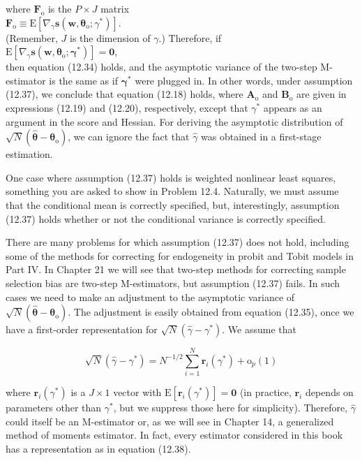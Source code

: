 \documentclass[10pt]{article}
\begin{document}
where $\mathbf{F}_{\mathrm{o}}$ is the $P \times J$ matrix\\
$\mathbf{F}_{\mathrm{o}} \equiv \mathrm{E}\left[\nabla_{\gamma} \mathbf{s}\left(\mathbf{w}, \boldsymbol{\theta}_{\mathrm{o}} ; \gamma^{*}\right)\right]$.\\
(Remember, $J$ is the dimension of $\gamma$.) Therefore, if\\
$\mathrm{E}\left[\nabla_{\gamma} \mathbf{s}\left(\mathbf{w}, \boldsymbol{\theta}_{\mathrm{o}} ; \boldsymbol{\gamma}^{*}\right)\right]=\mathbf{0}$,\\
then equation (12.34) holds, and the asymptotic variance of the two-step M-estimator is the same as if $\boldsymbol{\gamma}^{*}$ were plugged in. In other words, under assumption (12.37), we conclude that equation (12.18) holds, where $\mathbf{A}_{\mathrm{o}}$ and $\mathbf{B}_{\mathrm{o}}$ are given in expressions (12.19) and (12.20), respectively, except that $\gamma^{*}$ appears as an argument in the score and Hessian. For deriving the asymptotic distribution of $\sqrt{N}\left(\hat{\boldsymbol{\theta}}-\boldsymbol{\theta}_{\mathrm{o}}\right)$, we can ignore the fact that $\hat{\gamma}$ was obtained in a first-stage estimation.

One case where assumption (12.37) holds is weighted nonlinear least squares, something you are asked to show in Problem 12.4. Naturally, we must assume that the conditional mean is correctly specified, but, interestingly, assumption (12.37) holds whether or not the conditional variance is correctly specified.

There are many problems for which assumption (12.37) does not hold, including some of the methods for correcting for endogeneity in probit and Tobit models in Part IV. In Chapter 21 we will see that two-step methods for correcting sample selection bias are two-step M-estimators, but assumption (12.37) fails. In such cases we need to make an adjustment to the asymptotic variance of $\sqrt{N}\left(\hat{\boldsymbol{\theta}}-\boldsymbol{\theta}_{\mathrm{o}}\right)$. The adjustment is easily obtained from equation (12.35), once we have a first-order representation for $\sqrt{N}\left(\hat{\gamma}-\gamma^{*}\right)$. We assume that


\begin{equation*}
\sqrt{N}\left(\hat{\gamma}-\gamma^{*}\right)=N^{-1 / 2} \sum_{i=1}^{N} \mathbf{r}_{i}\left(\gamma^{*}\right)+\mathrm{o}_{p}(1) \tag{12.38}
\end{equation*}


where $\mathbf{r}_{i}\left(\gamma^{*}\right)$ is a $J \times 1$ vector with $\mathrm{E}\left[\mathbf{r}_{i}\left(\gamma^{*}\right)\right]=\mathbf{0}$ (in practice, $\mathbf{r}_{i}$ depends on parameters other than $\gamma^{*}$, but we suppress those here for simplicity). Therefore, $\hat{\gamma}$ could itself be an M-estimator or, as we will see in Chapter 14, a generalized method of moments estimator. In fact, every estimator considered in this book has a representation as in equation (12.38).
\end{document}
